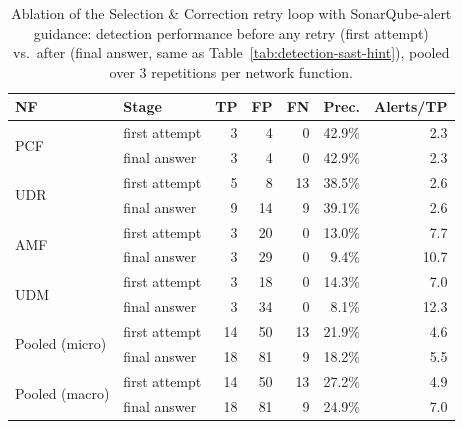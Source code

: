 \begin{table}[t]
\centering
\caption{Ablation of the Selection \& Correction retry loop with SonarQube-alert guidance: detection performance before any retry (first attempt) vs.\ after (final answer, same as Table~\ref{tab:detection-sast-hint}), pooled over 3 repetitions per network function.}
\label{tab:ablation-retry-hint}
\begin{tabular}{llrrrrr}
\toprule
NF & Stage & TP & FP & FN & Prec. & Alerts/TP \\
\midrule
\multirow{2}{*}{PCF} & first attempt & 3 & 4  & 0 & 42.9\% & 2.3 \\
                      & final answer   & 3 & 4  & 0 & 42.9\% & 2.3 \\
\midrule
\multirow{2}{*}{UDR} & first attempt & 5 & 8  & 13 & 38.5\% & 2.6 \\
                      & final answer   & 9 & 14 & 9  & 39.1\% & 2.6 \\
\midrule
\multirow{2}{*}{AMF} & first attempt & 3 & 20 & 0  & 13.0\% & 7.7 \\
                      & final answer   & 3 & 29 & 0  & 9.4\%  & 10.7 \\
\midrule
\multirow{2}{*}{UDM} & first attempt & 3 & 18 & 0  & 14.3\% & 7.0 \\
                      & final answer   & 3 & 34 & 0  & 8.1\%  & 12.3 \\
\midrule
\multirow{2}{*}{Pooled (micro)} & first attempt & 14 & 50 & 13 & 21.9\% & 4.6 \\
                                 & final answer   & 18 & 81 & 9  & 18.2\% & 5.5 \\
\multirow{2}{*}{Pooled (macro)} & first attempt & 14 & 50 & 13 & 27.2\% & 4.9 \\
                                 & final answer   & 18 & 81 & 9  & 24.9\% & 7.0 \\
\bottomrule
\end{tabular}
\\[2pt]

\end{table}

